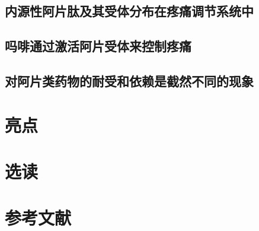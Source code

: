 \subsection{内源性阿片肽及其受体分布在疼痛调节系统中}
\subsection{吗啡通过激活阿片受体来控制疼痛}
\subsection{对阿片类药物的耐受和依赖是截然不同的现象}

\section{亮点}
\section{选读}
\section{参考文献}